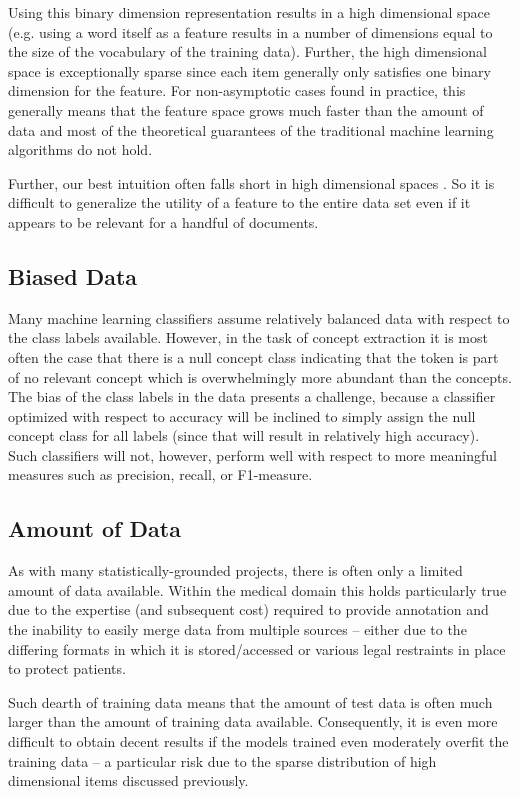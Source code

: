 \documentclass[preprint]{style}
\begin{document}
Using this binary dimension representation results in a high dimensional space (e.g. using a word itself as a feature results in a number of dimensions equal to the size of the vocabulary of the training data). Further, the high dimensional space is exceptionally sparse since each item generally only satisfies one binary dimension for the feature. For non-asymptotic cases found in practice, this generally means that the feature space grows much faster than the amount of data and most of the theoretical guarantees of the traditional machine learning algorithms do not hold.

Further, our best intuition often falls short in high dimensional spaces \cite{dimensions}. So it is difficult to generalize the utility of a feature to the entire data set even if it appears to be relevant for a handful of documents.

\subsection{Biased Data}
Many machine learning classifiers assume relatively balanced data with respect to the class labels available. However, in the task of concept extraction it is most often the case that there is a null concept class indicating that the token is part of no relevant concept which is overwhelmingly more abundant than the concepts. The bias of the class labels in the data presents a challenge, because a classifier optimized with respect to accuracy will be inclined to simply assign the null concept class for all labels (since that will result in relatively high accuracy). Such classifiers will not, however, perform well with respect to more meaningful measures such as precision, recall, or F1-measure.


\subsection{Amount of Data}
As with many statistically-grounded projects, there is often only a limited amount of data available. Within the medical domain this holds particularly true due to the expertise (and subsequent cost) required to provide annotation and the inability to easily merge data from multiple sources -- either due to the differing formats in which it is stored/accessed or various legal restraints in place to protect patients.

Such dearth of training data means that the amount of test data is often much larger than the amount of training data available. Consequently, it is even more difficult to obtain decent results if the models trained even moderately overfit the training data -- a particular risk due to the sparse distribution of high dimensional items discussed previously.
\end{document}
